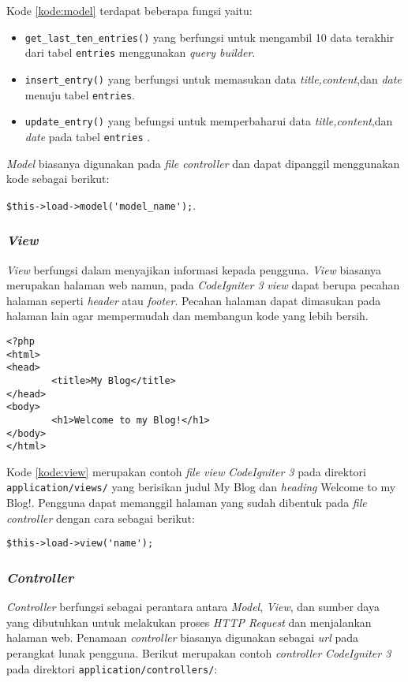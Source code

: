 Kode \ref{kode:model} terdapat beberapa fungsi yaitu:
\begin{itemize}
\item \verb|get_last_ten_entries()| yang berfungsi untuk mengambil 10 data terakhir dari tabel \verb|entries| menggunakan \textit{query builder}.
\item \verb|insert_entry()| yang berfungsi untuk memasukan data \textit{title,content},dan \textit{date} menuju tabel \verb|entries|.
\item \verb|update_entry()| yang befungsi untuk memperbaharui data \textit{title,content},dan \textit{date} pada tabel \verb|entries| .
\end{itemize}
\textit{Model} biasanya digunakan pada \textit{file controller} dan dapat dipanggil menggunakan kode sebagai berikut: 
\begin{center}
\verb|$this->load->model('model_name');|.
\end{center}

\subsubsection{\textit{\textbf{View}}}
\textit{View} berfungsi dalam menyajikan informasi kepada pengguna. \textit{View} biasanya merupakan halaman web namun, pada \textit{CodeIgniter 3} \textit{view} dapat berupa pecahan halaman seperti \textit{header} atau \textit{footer}. Pecahan halaman dapat dimasukan pada halaman lain agar mempermudah dan membangun kode yang lebih bersih.

\begin{lstlisting}[caption=Contoh \textit{view} pada \textit{CodeIgniter 3}, label=kode:view]
<?php
<html>
<head>
        <title>My Blog</title>
</head>
<body>
        <h1>Welcome to my Blog!</h1>
</body>
</html>
\end{lstlisting}

Kode \ref{kode:view} merupakan contoh \textit{file view} \textit{CodeIgniter 3} pada direktori \verb|application/views/| yang berisikan judul My Blog dan \textit{heading} Welcome to my Blog!. Pengguna dapat memanggil halaman yang sudah dibentuk pada \textit{file controller} dengan cara sebagai berikut:

\begin{center}
\verb|$this->load->view('name');|
\end{center}

\subsubsection{\textit{\textbf{Controller}}} 
\textit{Controller} berfungsi sebagai perantara antara \textit{Model}, \textit{View}, dan sumber daya yang dibutuhkan untuk melakukan proses \textit{HTTP Request} dan menjalankan halaman web. Penamaan \textit{controller} biasanya digunakan sebagai \textit{url} pada perangkat lunak pengguna. Berikut merupakan contoh \textit{controller} \textit{CodeIgniter 3} pada direktori \verb|application/controllers/|:

